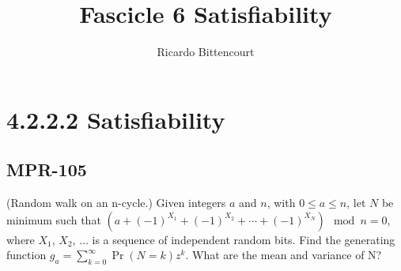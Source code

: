 \documentclass[10pt]{book}
\begin{document}
\title{Fascicle 6 Satisfiability}
\author{Ricardo Bittencourt}
\maketitle

\chapter{4.2.2.2 Satisfiability}

\section{MPR-105}

(Random walk on an n-cycle.) Given integers $a$ and $n$, with $0\le a\le n$, let $N$ be minimum such that $(a+(-1)^{X_1}+(-1)^{X_2}+\cdots+(-1)^{X_N}) \mod n=0$, where $X_1$, $X_2$, $\dots$ is a sequence of independent random bits. Find the generating function $g_a=\sum_{k=0}^\infty \Pr(N=k)z^k$. What are the mean and variance of N?
\end{document}
